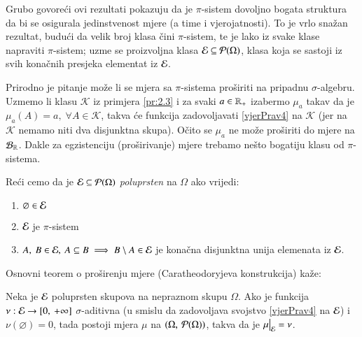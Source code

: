 \begin{nap} \label{nap:2.10}
    Grubo govore\' ci ovi rezultati pokazuju da je $\pi$-sistem
    dovoljno bogata struktura da bi se osigurala jedinstvenost mjere
    (a time i vjerojatnosti). To je vrlo sna\v zan rezultat,
    budu\' ci da velik broj klasa \v cini $\pi$-sistem, te je lako iz
    svake klase napraviti $\pi$-sistem; uzme se proizvoljna klasa
    $\mathcal{E} \subseteq \mathcal{P}({\Omega})$, klasa koja se sastoji iz svih
    kona\v cnih presjeka elementat iz $\mathcal{E}$.

    Prirodno je pitanje mo\v ze li se mjera sa $\pi$-sistema
    pro\v siriti na pripadnu $\sigma$-algebru. Uzmemo li klasu
    $\mathcal{K}$ iz primjera \ref{pr:2.3} i za svaki $a \in \mathbb{R}_+$
    izabermo $\mu_a$ takav da je $\mu_a(A) = a, \; \forall A \in
    \mathcal{K}$, takva \' ce funkcija zadovoljavati
    \eqref{vjerPrav4} na $\mathcal{K}$ (jer na $\mathcal{K}$ nemamo
    niti dva disjunktna skupa). O\v cito se $\mu_a$ ne mo\v ze
    pro\v siriti do mjere na $\mathcal{B}_{\mathbb{R}}$.
    Dakle za egzistenciju  (pro\v sirivanje) mjere trebamo ne\v sto
    bogatiju klasu od $\pi$-sistema.
\end{nap}

Re\' ci cemo da je $\mathcal{E} \subseteq \mathcal{P}({\Omega})$ \emph{poluprsten}
na $\Omega$ ako vrijedi:
\begin{enumerate}[label=(\roman*)]
    \item $\varnothing \in \mathcal{E}$
    \item $\mathcal{E}$ je $\pi$-sistem
    \item $A, \: B \in \mathcal{E}, \: A \subseteq B \implies B \setminus
        A \in \mathcal{E}$ je kona\v cna disjunktna unija elemenata iz $\mathcal{E}$.
\end{enumerate}

Osnovni teorem o pro\v sirenju mjere (Caratheodoryjeva konstrukcija)
ka\v ze:

\begin{tm}  \label{tm:2.11}
    Neka je $\mathcal{E}$ poluprsten skupova na nepraznom skupu $\Omega$. Ako
    je funkcija $\nu: \mathcal{E} \to [0, \: + \infty]$ $\sigma$-aditivna
    (u smislu da zadovoljava svojstvo \eqref{vjerPrav4} na $\mathcal{E}$)
    i $\nu(\varnothing) = 0$, tada postoji mjera $\mu$ na $(\Omega,
    \: \mathcal{P}({\Omega}))$, takva da je $\restr{\mu}{\E} = \nu$.
\end{tm}

